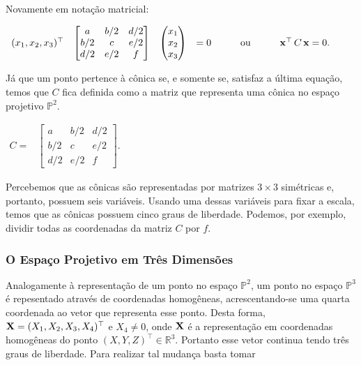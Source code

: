 Novamente em notação matricial:

\begin{center}
$
\begin{array}{cccccc}
  (x_1,x_2,x_3)^\top 
& \begin{bmatrix}
  a & b/2 & d/2\\
  b/2 & c & e/2\\
  d/2 & e/2 & f
  \end{bmatrix}
& \begin{pmatrix}
  x_1\\
  x_2\\
  x_3
  \end{pmatrix}
& = 0
& \qquad \text{ou} \qquad
& \mathbf{x}^\top\,C\,\mathbf{x} = 0.
\end{array}
$
\end{center}

Já que um ponto pertence à cônica se, e somente se, satisfaz a última equação, temos que $C$ fica definida como a matriz que representa uma cônica no espaço projetivo $\mathbb{P}^2$.

\begin{center}
$
\begin{array}{cc}
C = & \begin{bmatrix}
      a & b/2 & d/2\\
      b/2 & c & e/2\\
      d/2 & e/2 & f
      \end{bmatrix}.
\end{array}
$
\end{center}


Percebemos que as cônicas são representadas por matrizes $3\times3$ simétricas e, portanto, possuem seis variáveis. Usando uma dessas variáveis para fixar a escala, temos que as cônicas possuem cinco graus de liberdade. Podemos, por exemplo, dividir todas as coordenadas da matriz $C$ por $f$. 

\subsubsection{O Espaço Projetivo em Três Dimensões}




Analogamente à representação de um ponto no espaço $\mathbb{P}^2$, um ponto no espaço $\mathbb{P}^3$ é repesentado através de coordenadas homogêneas, acrescentando-se uma quarta coordenada ao vetor que representa esse ponto. Desta forma, $\mathbf{X} = (X_1,X_2,X_3,X_4)^\top$ e $X_4 \ne 0$, onde $\mathbf{X}$ é a representação em coordenadas homogêneas do ponto $(X,Y,Z)^\top \in \mathbb{R}^3$. Portanto esse vetor continua tendo três graus de liberdade. Para realizar tal mudança basta tomar 

